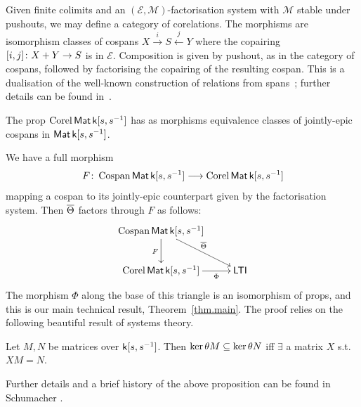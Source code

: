 Given finite colimits and an $(\mathcal E,\mathcal M)$-factorisation system with
$\mathcal M$ stable under pushouts, we may define a category of corelations. The
morphisms are isomorphism classes of cospans $X \xrightarrow{i} S \xleftarrow{j}
Y$ where the copairing $[i,j]{\colon} X+Y \to S$ is in $\mathcal E$.  Composition
is given by pushout, as in the category of cospans, followed by factorising the
copairing of the resulting cospan. This is a dualisation of the well-known
construction of relations from spans~\cite{JW}; further details can be found
in~\cite{Fo}.


\begin{definition}
  The prop $\operatorname{{Corel}} \operatorname{\mathsf{Mat}} {\mathsf{k}[s,s^{-1}]}$ has as morphisms equivalence classes of
  jointly-epic cospans in $\operatorname{\mathsf{Mat}}{\mathsf{k}[s,s^{-1}]}$.  
\end{definition}

We have a full morphism
\[
  F{\colon} \operatorname{{Cospan}} \operatorname{\mathsf{Mat}} {\mathsf{k}[s,s^{-1}]} \longrightarrow \operatorname{{Corel}} \operatorname{\mathsf{Mat}} {\mathsf{k}[s,s^{-1}]}
\]
mapping a cospan to its jointly-epic counterpart given by the
 factorisation system. %
Then $\overline{\Theta}$
factors through $F$ as follows:
\[
  \xymatrixrowsep{2pc}
  \xymatrix{
    \cospan\mat\pk \ar[d]_F \ar[dr]^{\cospanfunrest} \\
    \corel\mat\pk \ar[r]_-{\Phi} & \ltids
  }
\]
The morphism $\Phi$ along the base of this triangle is an isomorphism of props, 
and this is our main technical result, Theorem~\ref{thm.main}. The proof relies
on the following beautiful result of systems theory.

\begin{proposition} \label{prop.magic}
  Let $M,N$ be matrices over ${\mathsf{k}[s,s^{-1}]}$. Then $\ker \theta M \subseteq \ker \theta N$ iff $\exists$ a matrix $X$ s.t.\ $XM = N$.
\end{proposition}

Further details and a brief history of the above proposition can be found in
Schumacher \cite[pp.7--9]{Sc}. 

